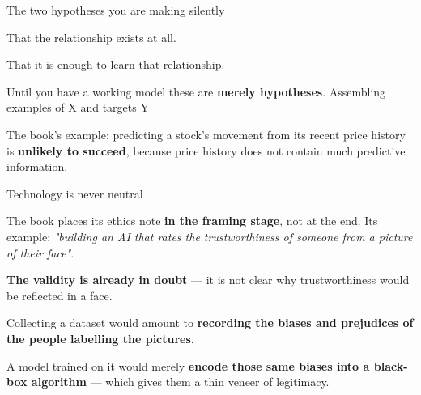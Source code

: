 \documentclass[aspectratio=169,11pt,t]{beamer}
\begin{document}
\begin{frame}[shrink=25]{The two hypotheses you are making silently}
\begin{minipage}[t]{0.494\textwidth}
\begin{icardaccent}
That the relationship exists at all.
\end{icardaccent}
\end{minipage}%
\hfill
\begin{minipage}[t]{0.494\textwidth}
\begin{icardaccent}
That it is enough to learn that relationship.
\end{icardaccent}
\end{minipage}%
\begin{iband}[rose]
Until you have a working model these are \textbf{merely hypotheses}. Assembling examples of X and targets Y 
\end{iband}
{\fontsize{9.4}{12.6}\selectfont\color{fg2}The book's example: predicting a stock's movement from its recent price history is \textbf{unlikely to succeed}, because price history does not contain much predictive information.\par}\vskip 4pt
\end{frame}

\begin{frame}[shrink=25]{Technology is never neutral}
{\fontsize{9.4}{12.6}\selectfont\color{fg2}The book places its ethics note \textbf{in the framing stage}, not at the end. Its example: \textit{"building an AI that rates the trustworthiness of someone from a picture of their face"}.\par}\vskip 4pt
\begin{isteps}
\item \textbf{The validity is already in doubt} --- it is not clear why trustworthiness would be reflected in a face.
\item Collecting a dataset would amount to \textbf{recording the biases and prejudices of the people labelling the pictures}.
\item A model trained on it would merely \textbf{encode those same biases into a black-box algorithm} --- which gives them a thin veneer of legitimacy.
\end{isteps}
\end{frame}
\end{document}
